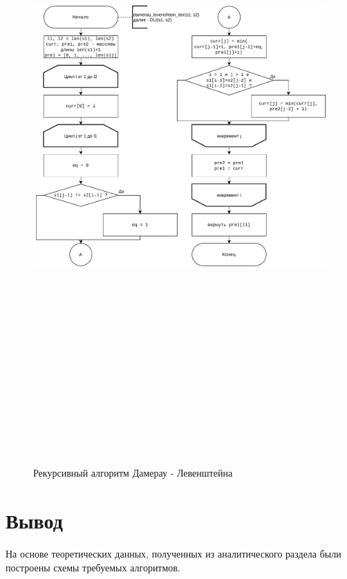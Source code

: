         \begin{figure}
            \centering
            \includegraphics[width=15cm,height=25cm,keepaspectratio]{images/dleven_iter.pdf}
            \caption{Рекурсивный алгоритм Дамерау - Левенштейна}
            \label{fig:dleven_iter}
        \end{figure}
    
    \clearpage

    \section*{Вывод}
    
        На основе теоретических данных, полученных из аналитического раздела были построены схемы требуемых алгоритмов.
